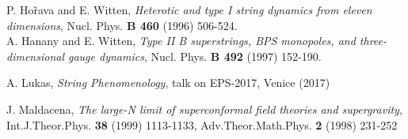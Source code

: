 \documentclass{cernyrep}
\begin{document}
\begin{thebibliography}{100}
P. Ho\~ rava and E. Witten, {\it Heterotic and type I string dynamics from eleven dimensions},  Nucl. Phys.  {\bf B 460} (1996) 506-524.\\
A. Hanany and E. Witten, {\it Type II B superstrings, BPS monopoles, and three-dimensional gauge dynamics},  Nucl. Phys.  {\bf B 492}  (1997) 152-190.

A. Lukas, {\it String Phenomenology}, 
talk on EPS-2017, Venice (2017)

J. Maldacena, {\it The large-N limit of superconformal field theories and supergravity},  Int.J.Theor.Phys. {\bf 38} (1999) 1113-1133, Adv.Theor.Math.Phys. {\bf 2} (1998) 231-252


\end{thebibliography}
\end{document}
